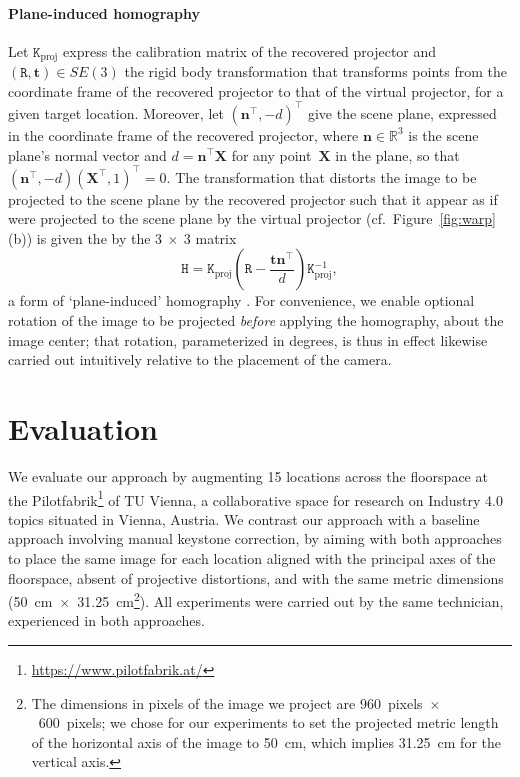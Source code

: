 \documentclass[review]{elsarticle}
\begin{document}
\paragraph{Plane-induced homography} Let $\mathtt{K}_\text{proj}$ express the calibration matrix of the recovered projector and $(\mathtt{R}, \mathbf{t}) \in SE(3)$ the rigid body transformation that transforms points from the coordinate frame of the recovered projector to that of the virtual projector, for a given target location. Moreover, let $(\mathbf{n}^\top, -d)^\top$ give the scene plane, expressed in the coordinate frame of the recovered projector, where $\mathbf{n} \in \mathbb{R}^3$ is the scene plane's normal vector and $d = \mathbf{n}^\top\mathbf{X}$ for any point~$\mathbf{X}$ in the plane, so that $(\mathbf{n}^\top, -d) (\mathbf{X}^\top, 1)^\top = 0$. The transformation that distorts the image to be projected to the scene plane by the recovered projector such that it appear as if were projected to the scene plane by the virtual projector (cf.\ Figure~\ref{fig:warp}(b)) is given the by the $3~\times~3$ matrix
\begin{equation}
\mathtt{H} = \mathtt{K}_\text{proj}\left(\mathtt{R} - \frac{\mathbf{t}\mathbf{n}^\top}{d}\right)\mathtt{K}_\text{proj}^{-1},
\label{homgen}
\end{equation}
a form of `plane-induced' homography \cite{Hartley2004}. For convenience, we enable optional rotation of the image to be projected \textit{before} applying the homography, about the image center; that rotation, parameterized in degrees, is thus in effect likewise carried out intuitively relative to the placement of the camera.

\section{Evaluation}

We evaluate our approach by augmenting 15 locations across the floorspace at the Pilotfabrik\footnote{\url{https://www.pilotfabrik.at/}} of TU Vienna, a collaborative space for research on Industry 4.0 topics situated in Vienna, Austria. We contrast our approach with a baseline approach involving manual keystone correction, by aiming with both approaches to place the same image for each location aligned with the principal axes of the floorspace, absent of projective distortions, and with the same metric dimensions (50~cm~$\times$~31.25~cm\footnote{The dimensions in pixels of the image we project are 960~pixels~$\times$~600~pixels; we chose for our experiments to set the projected metric length of the horizontal axis of the image to 50~cm, which implies 31.25~cm for the vertical axis.}). All experiments were carried out by the same technician, experienced in both approaches.
\end{document}
